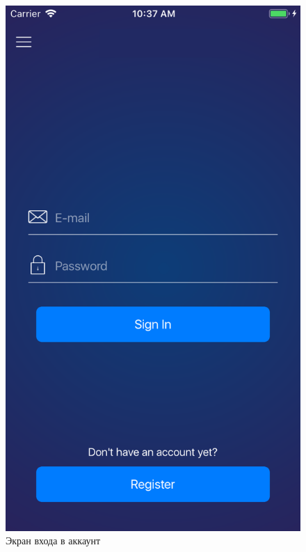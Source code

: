 ~
\begin{figure}[H]
\centering
	\includegraphics[scale=0.2]{figures/userGuide/signIn.png}
	\caption{Экран входа в аккаунт}
	\label{fig:develop:userGuide:signIn}
\end{figure}
~
